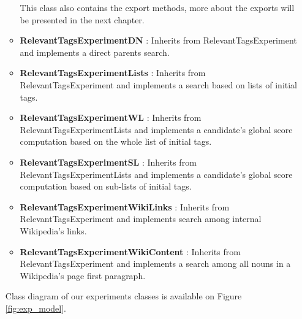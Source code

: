 \begin{itemize}
\begin{itemize}
  		This class also contains the export methods, more about the exports will be presented in the next chapter.
  		\item \textbf{RelevantTagsExperimentDN} : Inherits from RelevantTagsExperiment and implements a direct parents search.
  		\item \textbf{RelevantTagsExperimentLists} : Inherits from RelevantTagsExperiment and implements a search based on lists of initial tags.
  		\item \textbf{RelevantTagsExperimentWL} : Inherits from RelevantTagsExperimentLists and implements a candidate's global score computation based on the whole list of initial tags.
  		\item \textbf{RelevantTagsExperimentSL} : Inherits from RelevantTagsExperimentLists and implements a candidate's global score computation based on sub-lists of initial tags.
  		\item \textbf{RelevantTagsExperimentWikiLinks} : Inherits from RelevantTagsExperiment and implements search among internal Wikipedia's links.
  		\item \textbf{RelevantTagsExperimentWikiContent} : Inherits from RelevantTagsExperiment and implements a search among all nouns in a Wikipedia's page first paragraph.
  	\end{itemize}
  	Class diagram of our experiments classes is available on Figure \ref{fig:exp_model}.
  \end{itemize}  


